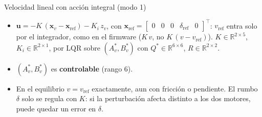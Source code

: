\documentclass[10pt,aspectratio=169]{beamer}
\newcommand{\vx}{\mathbf{x}}
\newcommand{\vu}{\mathbf{u}}
\newcommand{\rf}{\text{ref}}
\begin{document}
\begin{frame}{Velocidad lineal con acción integral (modo 1)}
\begin{itemize}
  \item $\vu=-K\,(\vx_v-\vx_\rf)-K_i\,z_v$, con
  $\vx_\rf=\begin{bmatrix}0&0&0&\delta_\rf&0\end{bmatrix}^{\!\top}$: $v_\rf$ entra
  solo por el integrador, como en el firmware ($K\,v$, no $K\,(v-v_\rf)$). $K\in\mathbb{R}^{2\times5}$,
  $K_i\in\mathbb{R}^{2\times1}$, por LQR sobre $(A_v^*,B_v^*)$ con
  $Q^*\in\mathbb{R}^{6\times6}$, $R\in\mathbb{R}^{2\times2}$.
  \item $(A_v^*,B_v^*)$ es \textbf{controlable} (rango 6).
  \item En el equilibrio $v=v_\rf$ \alert{exactamente}, aun con fricción o pendiente.
  El rumbo $\delta$ solo se regula con $K$: si la perturbación afecta distinto a los
  dos motores, puede quedar un error en $\delta$.
\end{itemize}
\end{frame}
\end{document}
